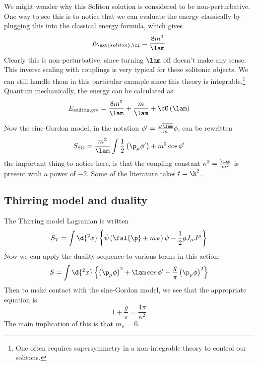 \documentclass{booc}
\begin{document}
We might wonder why this Soliton solution is considered to be non-perturbative.
One way to see this is to notice that we 
can evaluate the energy classically by plugging this into the classical energy formula, which gives
\begin{equation}
E_{\ext{soliton},\cl} = 
\frac{8m^3}{\lam}
\end{equation}
Clearly this is non-perturbative, since turning $\lam$ off doesn't make any sense. 
This inverse scaling with couplings is very typical for these solitonic objects.
We can still handle them in this particular example since this theory is integrable.\footnote{
One often requires supersymmetry in a non-integrable theory to control our solitons.}
Quantum mechanically, the energy can be calculated as:
\begin{equation}
E_{\text{soliton}, qm} = \frac{8m^3}{\lam} + \frac{m}{\lam} + \cO\left( \lam \right)
\end{equation}

Now the sine-Gordon model, in the notation 
$\phi' = \frac{\sqrt{\lam}}{m} \phi$, can be rewritten
\begin{equation}
S_{\text{SG}} = \frac{m^2}{\lam}
\int
\frac{1}{2} \left( \p_\mu \phi' \right) + m^2 \cos \phi'
\end{equation}
the important thing to notice here, is that the coupling constant $\kappa^2 = \frac{\lam}{m^2}$
is present with a power of $-2$.
Some of the literature takes $t = \k^2$.

\subsection{Thirring model and duality}

The Thirring model Lagranian is written
\begin{equation}
S_T = \int \d{^2 x}
\left\{ 
\bar \psi\left( 
\fsl{\p} + m_F
\right) \psi - \frac{1}{2} g J_\mu J^\mu
\right\}
\end{equation}
Now we can apply the duality sequence to various terms in this action:
\begin{equation}
S =
\int \d{^2 x} \left\{ 
\left( \p_\mu \phi \right)^2 + 
\Lam \cos \phi' + \frac{g}{\pi} \left( \p_\mu \phi \right)^2
\right\}
\end{equation}
Then to make contact with the sine-Gordon model, we see that the appropriate equation is:
\begin{equation}
1 + \frac{g}{\pi} = \frac{4\pi}{\kappa^2}
\end{equation}
The main implication of this is that
$m_F = 0$. 
\end{document}
